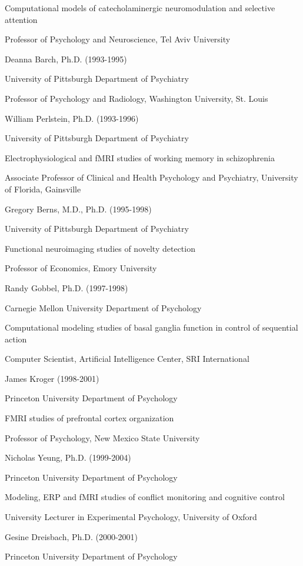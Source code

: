 \documentclass[10 pt]{article}
\begin{document}
Computational models of catecholaminergic neuromodulation and selective attention

Professor of Psychology and Neuroscience, Tel Aviv University
    \medskip

Deanna Barch, Ph.D. (1993-1995)

University of Pittsburgh Department of Psychiatry

Professor of Psychology and Radiology, Washington University, St. Louis
    \medskip

William Perlstein, Ph.D. (1993-1996)

University of Pittsburgh Department of Psychiatry

Electrophysiological and fMRI studies of working memory in schizophrenia

Associate Professor of Clinical and Health Psychology and Psychiatry, University of Florida, Gainsville
    \medskip

Gregory Berns, M.D., Ph.D. (1995-1998)

University of Pittsburgh Department of Psychiatry

Functional neuroimaging studies of novelty detection

Professor of Economics, Emory University
    \medskip

Randy Gobbel, Ph.D. (1997-1998)

Carnegie Mellon University Department of Psychology

Computational modeling studies of basal ganglia function in control of sequential action

Computer Scientist, Artificial Intelligence Center, SRI International
    \medskip

James Kroger (1998-2001)

Princeton University Department of Psychology

FMRI studies of prefrontal cortex organization

Professor of Psychology, New Mexico State University
    \medskip

Nicholas Yeung, Ph.D. (1999-2004)

Princeton University Department of Psychology

Modeling, ERP and fMRI studies of conflict monitoring and cognitive control

University Lecturer in Experimental Psychology, University of Oxford
    \medskip

Gesine Dreisbach, Ph.D. (2000-2001)

Princeton University Department of Psychology
\end{document}
